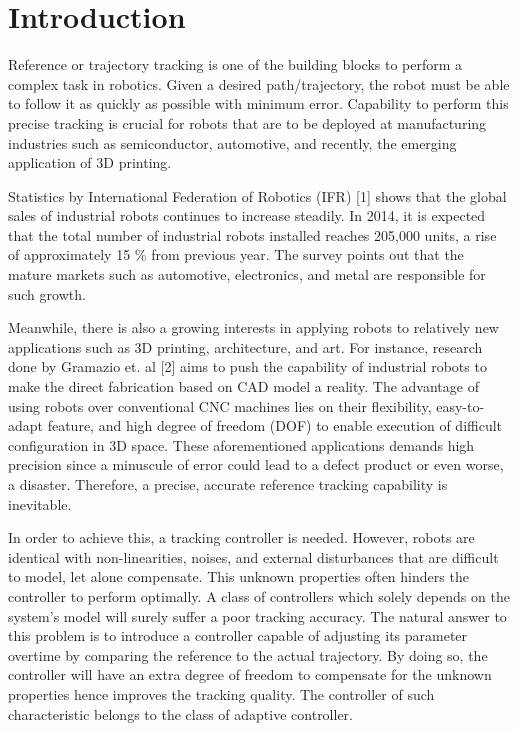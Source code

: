 %
\chapter{Introduction} \label{chap::intro}
Reference or trajectory tracking is one of the building blocks to perform a complex task in robotics. Given a desired path/trajectory, the robot must be able to follow it as quickly as possible with minimum error. Capability to perform this precise tracking is crucial for robots that are to be deployed at manufacturing industries such as semiconductor, automotive, and recently, the emerging application of 3D printing. 

Statistics by International Federation of Robotics (IFR) [1] shows that the global sales of industrial robots continues to increase steadily. In 2014, it is expected that the total number of industrial robots installed reaches 205,000 units, a rise of approximately 15 \% from previous year. The survey points out that the mature markets such as automotive, electronics, and metal are responsible for such growth. 

Meanwhile, there is also a growing interests in applying robots to relatively new applications such as 3D printing, architecture, and art. For instance, research done by Gramazio et. al [2] aims to push the capability of industrial robots to make the direct fabrication based on CAD model a reality. The advantage of using robots over conventional CNC machines lies on their flexibility, easy-to-adapt feature, and high degree of freedom (DOF) to enable execution of difficult configuration in 3D space. These aforementioned applications demands high precision since a minuscule of error could lead to a defect product or even worse, a disaster. Therefore, a precise, accurate reference tracking capability is inevitable.

In order to achieve this, a tracking controller is needed. However, robots are identical with non-linearities, noises, and external disturbances that are difficult to model, let alone compensate. This unknown properties often hinders the controller to perform optimally. A class of controllers which solely depends on the system's model will surely suffer a poor tracking accuracy. The natural answer to this problem is to introduce a controller capable of adjusting its parameter overtime by comparing the reference to the actual trajectory. By doing so, the controller will have an extra degree of freedom to compensate for the unknown properties hence improves the tracking quality. The controller of such characteristic belongs to the class of adaptive controller.

